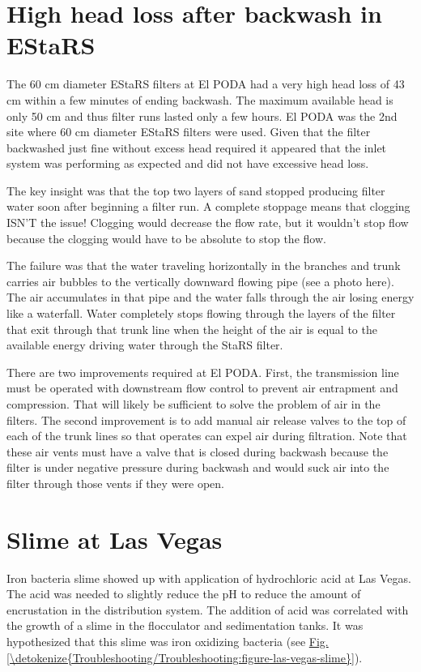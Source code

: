 \documentclass[letterpaper,10pt,english]{sphinxmanual}
\begin{document}
\section{High head loss after backwash in EStaRS}
\label{\detokenize{Troubleshooting/Troubleshooting:high-head-loss-after-backwash-in-estars}}
The 60 cm diameter EStaRS filters at El PODA had a very high head loss of 43 cm within a few minutes of ending backwash. The maximum available head is only 50 cm and thus filter runs lasted only a few hours. El PODA was the 2nd site where 60 cm diameter EStaRS filters were used. Given that the filter backwashed just fine without excess head required it appeared that the inlet system was performing as expected and did not have excessive head loss.

The key insight was that the top two layers of sand stopped producing filter water soon after beginning a filter run. A complete stoppage means that clogging ISN’T the issue! Clogging would decrease the flow rate, but it wouldn’t stop flow because the clogging would have to be absolute to stop the flow.

The failure was that the water traveling horizontally in the branches and trunk carries air bubbles to the vertically downward flowing pipe (see a photo here). The air accumulates in that pipe and the water falls through the air losing energy like a waterfall. Water completely stops flowing through the layers of the filter that exit through that trunk line when the height of the air is equal to the available energy driving water through the StaRS filter.

There are two improvements required at El PODA. First, the transmission line must be operated with downstream flow control to prevent air entrapment and compression. That will likely be sufficient to solve the problem of air in the filters. The second improvement is to add manual air release valves to the top of each of the trunk lines so that operates can expel air during filtration. Note that these air vents must have a valve that is closed during backwash because the filter is under negative pressure during backwash and would suck air into the filter through those vents if they were open.


\section{Slime at Las Vegas}
\label{\detokenize{Troubleshooting/Troubleshooting:slime-at-las-vegas}}
Iron bacteria slime showed up with application of hydrochloric acid at Las Vegas. The acid was needed to slightly reduce the pH to reduce the amount of encrustation in the distribution system. The addition of acid was correlated with the growth of a slime in the flocculator and sedimentation tanks. It was hypothesized that this slime was iron oxidizing bacteria (see \hyperref[\detokenize{Troubleshooting/Troubleshooting:figure-las-vegas-slime}]{Fig.\@ \ref{\detokenize{Troubleshooting/Troubleshooting:figure-las-vegas-slime}}}).
\end{document}
